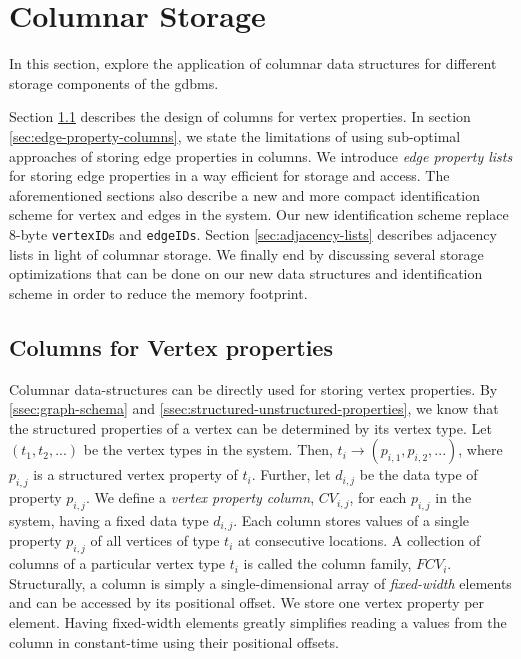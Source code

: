 \chapter{Columnar Storage}
\label{c:columnar-storage}

In this section,   explore the application of columnar data structures for different storage components of the \gls{gdbms}. 

Section \ref{sec:vertex-property-columns} describes the design of columns for vertex properties. In section \ref{sec:edge-property-columns}, we state the limitations of using sub-optimal approaches of storing edge properties in columns. We introduce \emph{edge property lists} for storing edge properties in a way efficient for storage and access. The aforementioned sections also describe a new and more compact identification scheme for vertex and edges in the system. Our new identification scheme replace 8-byte \texttt{vertexID}s and \texttt{edgeIDs}. Section \ref{sec:adjacency-lists} describes adjacency lists in light of columnar storage. We finally end by discussing several storage optimizations that can be done on our new data structures and identification scheme in order to reduce the memory footprint.

\section{Columns for Vertex properties}
\label{sec:vertex-property-columns}

Columnar data-structures can be directly used for storing vertex properties. By \ref{ssec:graph-schema} and \ref{ssec:structured-unstructured-properties}, we know that the structured properties of a vertex can be determined by its vertex type. Let $(t_1, t_2, ...)$ be the vertex types in the system. Then, $t_i \rightarrow (p_{i,1},  p_{i,2}, ...)$, where $p_{i, j}$ is a structured vertex property of $t_i$. Further, let $d_{i,j}$ be the data type of property $p_{i,j}$. We define a \emph{vertex property column}, $CV_{i,j}$, for each $p_{i,j}$ in the system, having a fixed data type $d_{i,j}$. Each column stores values of a single property $p_{i,j}$ of all vertices of type $t_i$ at consecutive locations. A collection of columns of a particular vertex type $t_i$ is called the column family, $FCV_i$. Structurally, a column is simply a single-dimensional array of \emph{fixed-width} elements and can be accessed by its positional offset. We store one vertex property per element. Having fixed-width elements greatly simplifies reading a values from the column in constant-time using their positional offsets.

